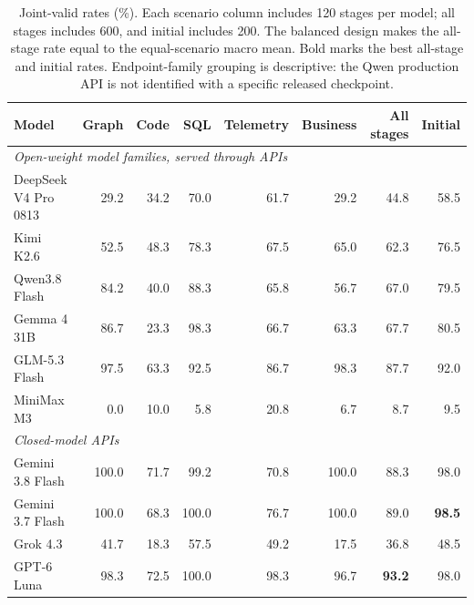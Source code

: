 \begin{table}[t]
\centering\small\setlength{\tabcolsep}{5pt}
\begin{tabular}{lrrrrrrr}
\toprule
Model & Graph & Code & SQL & Telemetry & Business & All stages & Initial \\
\midrule
\multicolumn{8}{l}{\emph{Open-weight model families, served through APIs}}\\
DeepSeek V4 Pro 0813 & 29.2 & 34.2 & 70.0 & 61.7 & 29.2 & 44.8 & 58.5 \\
Kimi K2.6 & 52.5 & 48.3 & 78.3 & 67.5 & 65.0 & 62.3 & 76.5 \\
Qwen3.8 Flash & 84.2 & 40.0 & 88.3 & 65.8 & 56.7 & 67.0 & 79.5 \\
Gemma 4 31B & 86.7 & 23.3 & 98.3 & 66.7 & 63.3 & 67.7 & 80.5 \\
GLM-5.3 Flash & 97.5 & 63.3 & 92.5 & 86.7 & 98.3 & 87.7 & 92.0 \\
MiniMax M3 & 0.0 & 10.0 & 5.8 & 20.8 & 6.7 & 8.7 & 9.5 \\
\midrule
\multicolumn{8}{l}{\emph{Closed-model APIs}}\\
Gemini 3.8 Flash & 100.0 & 71.7 & 99.2 & 70.8 & 100.0 & 88.3 & 98.0 \\
Gemini 3.7 Flash & 100.0 & 68.3 & 100.0 & 76.7 & 100.0 & 89.0 & \textbf{98.5} \\
Grok 4.3 & 41.7 & 18.3 & 57.5 & 49.2 & 17.5 & 36.8 & 48.5 \\
GPT-6 Luna & 98.3 & 72.5 & 100.0 & 98.3 & 96.7 & \textbf{93.2} & 98.0 \\
\bottomrule
\end{tabular}
\caption{Joint-valid rates (\%). Each scenario column includes 120 stages per model; all stages includes 600, and initial includes 200. The balanced design makes the all-stage rate equal to the equal-scenario macro mean. Bold marks the best all-stage and initial rates. Endpoint-family grouping is descriptive: the Qwen production API is not identified with a specific released checkpoint.}
\label{tab:quality}
\end{table}